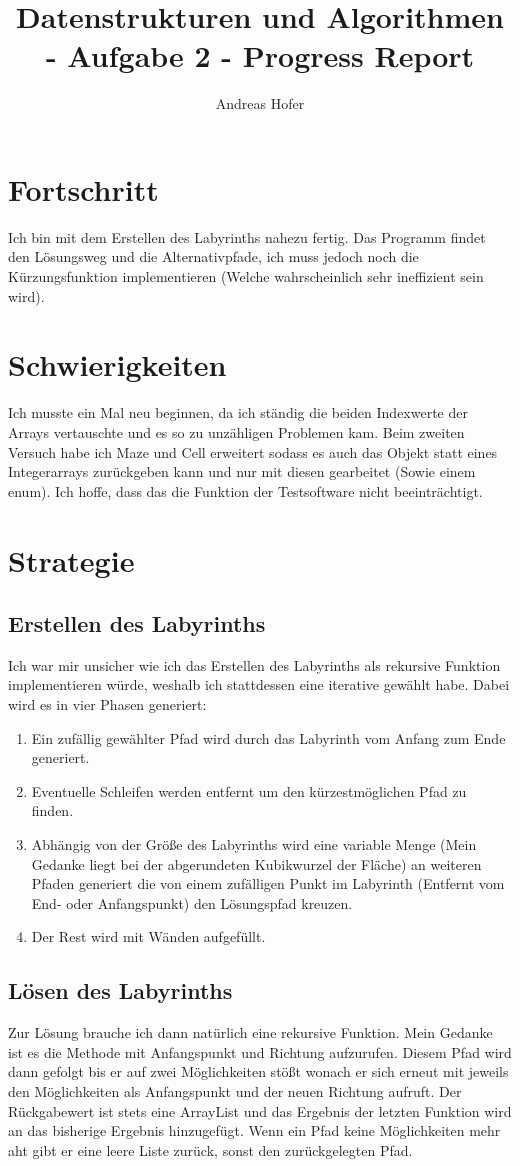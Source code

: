 \documentclass{article}
\title{\vspace{-1cm}Datenstrukturen und Algorithmen - Aufgabe 2 - Progress Report}
\author{Andreas Hofer}
\begin{document}
	\maketitle
	\section*{Fortschritt}
	Ich bin mit dem Erstellen des Labyrinths nahezu fertig. Das Programm findet den Lösungsweg und die Alternativpfade, ich muss jedoch noch die Kürzungsfunktion implementieren (Welche wahrscheinlich sehr ineffizient sein wird).
	\section*{Schwierigkeiten}
	Ich musste ein Mal neu beginnen, da ich ständig die beiden Indexwerte der Arrays vertauschte und es so zu unzähligen Problemen kam. Beim zweiten Versuch habe ich Maze und Cell erweitert sodass es auch das Objekt statt eines Integerarrays zurückgeben kann und nur mit diesen gearbeitet (Sowie einem enum). Ich hoffe, dass das die Funktion der Testsoftware nicht beeinträchtigt.
	\section*{Strategie}
	\subsection*{Erstellen des Labyrinths}
	Ich war mir unsicher wie ich das Erstellen des Labyrinths als rekursive Funktion implementieren würde, weshalb ich stattdessen eine iterative gewählt habe. Dabei wird es in vier Phasen generiert:
	\begin{enumerate}
		\item{Ein zufällig gewählter Pfad wird durch das Labyrinth vom Anfang zum Ende generiert.}
		\item{Eventuelle Schleifen werden entfernt um den kürzestmöglichen Pfad zu finden.}
		\item{Abhängig von der Größe des Labyrinths wird eine variable Menge (Mein Gedanke liegt bei der abgerundeten Kubikwurzel der Fläche) an weiteren Pfaden generiert die von einem zufälligen Punkt im Labyrinth (Entfernt vom End- oder Anfangspunkt) den Lösungspfad kreuzen.}
		\item{Der Rest wird mit Wänden aufgefüllt.}
	\end{enumerate}
	\subsection*{Lösen des Labyrinths}
	Zur Lösung brauche ich dann natürlich eine rekursive Funktion. Mein Gedanke ist es die Methode mit Anfangspunkt und Richtung aufzurufen. Diesem Pfad wird dann gefolgt bis er auf zwei Möglichkeiten stößt wonach er sich erneut mit jeweils den Möglichkeiten als Anfangspunkt und der neuen Richtung aufruft. Der Rückgabewert ist stets eine ArrayList und das Ergebnis der letzten Funktion wird an das bisherige Ergebnis hinzugefügt. Wenn ein Pfad keine Möglichkeiten mehr aht gibt er eine leere Liste zurück, sonst den zurückgelegten Pfad.
\end{document}
